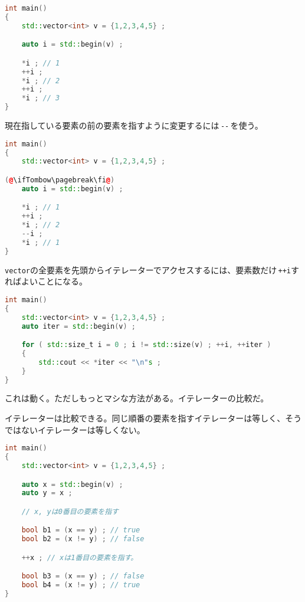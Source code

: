 \begin{lstlisting}[language={C++}]
int main()
{
    std::vector<int> v = {1,2,3,4,5} ;

    auto i = std::begin(v) ;

    *i ; // 1
    ++i ;
    *i ; // 2
    ++i ;
    *i ; // 3
}
\end{lstlisting}

現在指している要素の前の要素を指すように変更するには\,\texttt{{-}{-}}\,を使う。

\begin{lstlisting}[language={C++}]
int main()
{
    std::vector<int> v = {1,2,3,4,5} ;

(@\ifTombow\pagebreak\fi@)
    auto i = std::begin(v) ;

    *i ; // 1
    ++i ;
    *i ; // 2
    --i ;
    *i ; // 1
}
\end{lstlisting}

\texttt{vector}の全要素を先頭からイテレーターでアクセスするには、要素数だけ\,\texttt{++i}すればよいことになる。

\begin{lstlisting}[language={C++}]
int main()
{
    std::vector<int> v = {1,2,3,4,5} ;
    auto iter = std::begin(v) ;

    for ( std::size_t i = 0 ; i != std::size(v) ; ++i, ++iter )
    {
        std::cout << *iter << "\n"s ;
    }
}
\end{lstlisting}

これは動く。ただしもっとマシな方法がある。イテレーターの比較だ。


イテレーターは比較できる。同じ順番の要素を指すイテレーターは等しく、そうではないイテレーターは等しくない。

\begin{lstlisting}[language={C++}]
int main()
{
    std::vector<int> v = {1,2,3,4,5} ;

    auto x = std::begin(v) ;
    auto y = x ;

    // x, yは0番目の要素を指す

    bool b1 = (x == y) ; // true
    bool b2 = (x != y) ; // false

    ++x ; // xは1番目の要素を指す。

    bool b3 = (x == y) ; // false
    bool b4 = (x != y) ; // true
}
\end{lstlisting}

